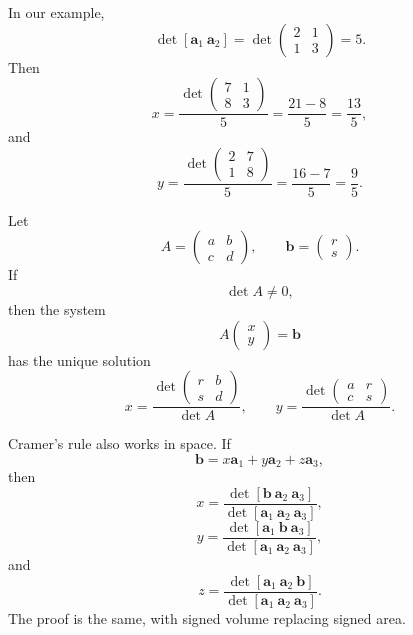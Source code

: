 In our example,
\[
    \det[\mathbf a_1\ \mathbf a_2]
    =
    \det
    \begin{pmatrix}
        2&1\\
        1&3
    \end{pmatrix}
    =
    5.
\]
Then
\[
    x
    =
    \frac{
    \det
    \begin{pmatrix}
        7&1\\
        8&3
    \end{pmatrix}}
    {5}
    =
    \frac{21-8}{5}
    =
    \frac{13}{5},
\]
and
\[
    y
    =
    \frac{
    \det
    \begin{pmatrix}
        2&7\\
        1&8
    \end{pmatrix}}
    {5}
    =
    \frac{16-7}{5}
    =
    \frac95.
\]

\begin{theorem}
Let
\[
    A=
    \begin{pmatrix}
        a&b\\
        c&d
    \end{pmatrix},
    \qquad
    \mathbf b=
    \begin{pmatrix}
        r\\s
    \end{pmatrix}.
\]
If
\[
    \det A\neq0,
\]
then the system
\[
    A
    \begin{pmatrix}
        x\\y
    \end{pmatrix}
    =
    \mathbf b
\]
has the unique solution
\[
\boxed{
    x=
    \frac{
    \det
    \begin{pmatrix}
        r&b\\
        s&d
    \end{pmatrix}}
    {\det A},
    \qquad
    y=
    \frac{
    \det
    \begin{pmatrix}
        a&r\\
        c&s
    \end{pmatrix}}
    {\det A}.
}
\]
\end{theorem}

Cramer's rule also works in space.  If
\[
    \mathbf b=x\mathbf a_1+y\mathbf a_2+z\mathbf a_3,
\]
then
\[
\boxed{
    x=
    \frac{\det[\mathbf b\ \mathbf a_2\ \mathbf a_3]}
         {\det[\mathbf a_1\ \mathbf a_2\ \mathbf a_3]},
}
\]
\[
\boxed{
    y=
    \frac{\det[\mathbf a_1\ \mathbf b\ \mathbf a_3]}
         {\det[\mathbf a_1\ \mathbf a_2\ \mathbf a_3]},
}
\]
and
\[
\boxed{
    z=
    \frac{\det[\mathbf a_1\ \mathbf a_2\ \mathbf b]}
         {\det[\mathbf a_1\ \mathbf a_2\ \mathbf a_3]}.
}
\]
The proof is the same, with signed volume replacing signed area.

